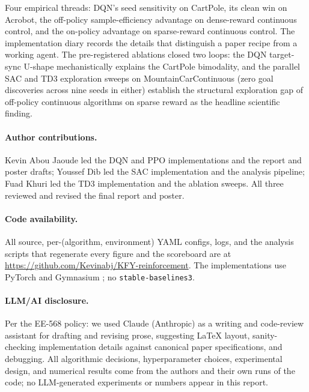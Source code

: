 \documentclass{article}
\begin{document}
Four empirical threads: DQN's seed sensitivity on CartPole, its clean win on Acrobot, the off-policy sample-efficiency advantage on dense-reward continuous control, and the on-policy advantage on sparse-reward continuous control. The implementation diary records the details that distinguish a paper recipe from a working agent. The pre-registered ablations closed two loops: the DQN target-sync U-shape mechanistically explains the CartPole bimodality, and the parallel SAC and TD3 exploration sweeps on MountainCarContinuous (zero goal discoveries across nine seeds in either) establish the structural exploration gap of off-policy continuous algorithms on sparse reward as the headline scientific finding.


\paragraph{Author contributions.}
Kevin Abou Jaoude led the DQN and PPO implementations and the report and poster drafts; Youssef Dib led the SAC implementation and the analysis pipeline; Fuad Khuri led the TD3 implementation and the ablation sweeps. All three reviewed and revised the final report and poster.

\paragraph{Code availability.}
All source, per-(algorithm, environment) YAML configs, logs, and the analysis scripts that regenerate every figure and the scoreboard are at \url{https://github.com/Kevinabj/KFY-reinforcement}. The implementations use PyTorch and Gymnasium \cite{towers2023gymnasium}; no \texttt{stable-baselines3}.

\paragraph{LLM/AI disclosure.}
Per the EE-568 policy: we used Claude (Anthropic) as a writing and code-review assistant for drafting and revising prose, suggesting LaTeX layout, sanity-checking implementation details against canonical paper specifications, and debugging. All algorithmic decisions, hyperparameter choices, experimental design, and numerical results come from the authors and their own runs of the code; no LLM-generated experiments or numbers appear in this report.

{\small


}
\end{document}
